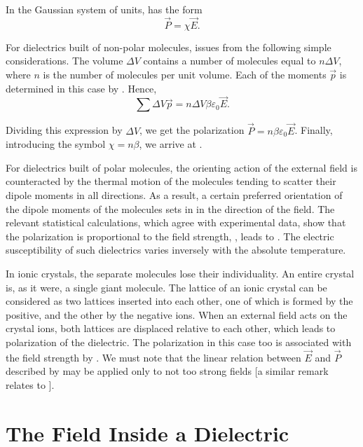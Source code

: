In the Gaussian system of units,  has the form
\begin{equation}\label{eq:2_6}
    \vec{P} = \chi \vec{E}.
\end{equation}

For dielectrics built of non-polar molecules,  issues from the following simple considerations. The volume $\Delta{V}$ contains a number of molecules equal to $n\Delta{V}$, where $n$ is the number of molecules per unit volume. Each of the moments $\vec{p}$ is determined in this case by . Hence,
\begin{equation*}
    \sum{\Delta{V}} \vec{p} = n \Delta{V} \beta \varepsilon_0 \vec{E}.
\end{equation*}

\noindent
Dividing this expression by $\Delta{V}$, we get the polarization $\vec{P}=n\beta\varepsilon_0\vec{E}$. Finally, introducing the symbol $\chi=n\beta$, we arrive at .

For dielectrics built of polar molecules, the orienting action of the external field is counteracted by the thermal motion of the molecules tending to scatter their dipole moments in all directions. As a result, a certain preferred orientation of the dipole moments of the molecules sets in in the direction of the field. The relevant statistical calculations, which agree with experimental data, show that the polarization is proportional to the field strength, \ie, leads to . The electric susceptibility of such dielectrics varies inversely with the absolute temperature.

In ionic crystals, the separate molecules lose their individuality. An entire crystal is, as it were, a single giant molecule. The lattice of an ionic crystal can be considered as two lattices inserted into each other, one of which is formed by the positive, and the other by the negative ions. When an external field acts on the crystal ions, both lattices are displaced relative to each other, which leads to polarization of the dielectric. The polarization in this case too is associated with the field strength by . We must note that the linear relation between $\vec{E}$ and $\vec{P}$ described by  may be applied only to not too strong fields [a similar remark relates to ].

\section{The Field Inside a Dielectric}\label{2_3}


